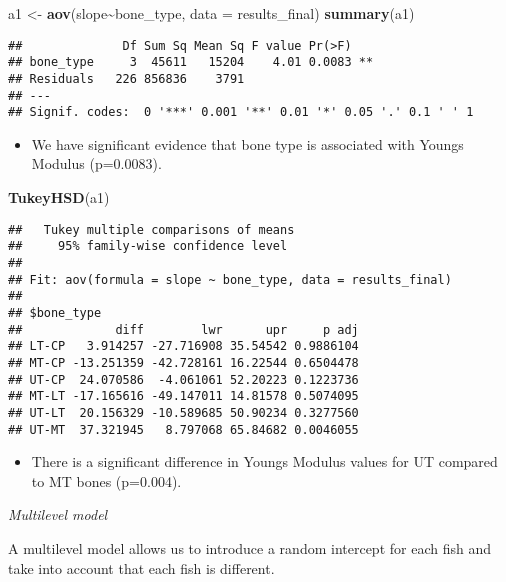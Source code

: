 \documentclass[
]{article}
\newenvironment{Shaded}{\begin{snugshade}}{\end{snugshade}}
\newcommand{\AttributeTok}[1]{\textcolor[rgb]{0.13,0.29,0.53}{#1}}
\newcommand{\FunctionTok}[1]{\textcolor[rgb]{0.13,0.29,0.53}{\textbf{#1}}}
\newcommand{\NormalTok}[1]{#1}
\newcommand{\OtherTok}[1]{\textcolor[rgb]{0.56,0.35,0.01}{#1}}
\newcommand{\SpecialCharTok}[1]{\textcolor[rgb]{0.81,0.36,0.00}{\textbf{#1}}}
\providecommand{\tightlist}{%
  \setlength{\itemsep}{0pt}\setlength{\parskip}{0pt}}
\begin{document}
\begin{Shaded}
\begin{Highlighting}[]
\NormalTok{a1 }\OtherTok{\textless{}{-}} \FunctionTok{aov}\NormalTok{(slope}\SpecialCharTok{\textasciitilde{}}\NormalTok{bone\_type, }\AttributeTok{data =}\NormalTok{ results\_final)}
\FunctionTok{summary}\NormalTok{(a1) }
\end{Highlighting}
\end{Shaded}

\begin{verbatim}
##              Df Sum Sq Mean Sq F value Pr(>F)   
## bone_type     3  45611   15204    4.01 0.0083 **
## Residuals   226 856836    3791                  
## ---
## Signif. codes:  0 '***' 0.001 '**' 0.01 '*' 0.05 '.' 0.1 ' ' 1
\end{verbatim}

\begin{itemize}
\tightlist
\item
  We have significant evidence that bone type is associated with Youngs
  Modulus (p=0.0083).
\end{itemize}

\begin{Shaded}
\begin{Highlighting}[]
\FunctionTok{TukeyHSD}\NormalTok{(a1)}
\end{Highlighting}
\end{Shaded}

\begin{verbatim}
##   Tukey multiple comparisons of means
##     95% family-wise confidence level
## 
## Fit: aov(formula = slope ~ bone_type, data = results_final)
## 
## $bone_type
##             diff        lwr      upr     p adj
## LT-CP   3.914257 -27.716908 35.54542 0.9886104
## MT-CP -13.251359 -42.728161 16.22544 0.6504478
## UT-CP  24.070586  -4.061061 52.20223 0.1223736
## MT-LT -17.165616 -49.147011 14.81578 0.5074095
## UT-LT  20.156329 -10.589685 50.90234 0.3277560
## UT-MT  37.321945   8.797068 65.84682 0.0046055
\end{verbatim}

\begin{itemize}
\tightlist
\item
  There is a significant difference in Youngs Modulus values for UT
  compared to MT bones (p=0.004).
\end{itemize}

\emph{Multilevel model}

A multilevel model allows us to introduce a random intercept for each
fish and take into account that each fish is different.
\end{document}
